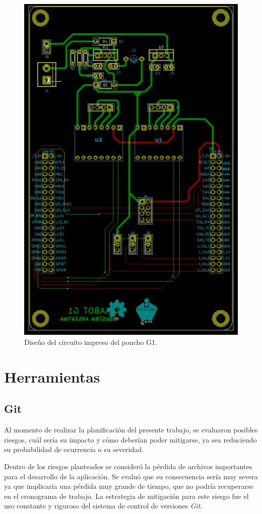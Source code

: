 \begin{figure}[H]
\centering
\includegraphics[scale=.8]{./Figures/g1-pcb.JPG}
\caption{Diseño del circuito impreso del poncho G1.}
\label{fig:g1PCB}
\end{figure}

\section{Herramientas}
\subsection{Git}
Al momento de realizar la planificación del presente trabajo, se evaluaron posibles riesgos, cuál sería su impacto y cómo deberían poder mitigarse, ya sea reduciendo su probabilidad de ocurrencia o su severidad.

Dentro de los riesgos planteados se consideró la pérdida de archivos importantes para el desarrollo de la aplicación. Se evaluó que su consecuencia sería muy severa ya que implicaría una pérdida muy grande de tiempo, que no podría recuperarse en el cronograma de trabajo. La estrategia de mitigación para este riesgo fue el uso constante y riguroso del sistema de control de versiones \emph{Git}.


